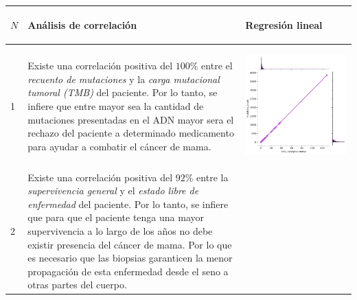 \begin{table}[htb!]
	\footnotesize
	\begin{threeparttable}
		\begin{tabular}{p{0.5cm} p{7cm} p{6.5cm}} \toprule
			\begin{center}$N$\end{center}   	 
			&\begin{center}Análisis de correlación\end{center}             
			&\begin{center}Regresión lineal\end{center}\\ \hline
			1
			& Existe una correlación positiva del $100\%$ entre el \textit{recuento de mutaciones} y la \textit{carga mutacional tumoral (TMB)} del paciente. Por lo tanto, se infiere que entre mayor sea la cantidad de mutaciones presentadas en el ADN mayor sera el rechazo del paciente a determinado medicamento para ayudar a combatir el cáncer de mama.
			
			& \begin{center}\includegraphics[width=1\linewidth]{NOTEBOOK/IMAGENES_CORRELACION/reg_tmb_nonsynonymous_mutation_count}\end{center}
			\\ \hline
			2
			& Existe una correlación positiva del $92\%$ entre la \textit{supervivencia general} y el \textit{estado libre de enfermedad} del paciente. Por lo tanto, se infiere que para que el paciente tenga una mayor supervivencia a lo largo de los años no debe existir presencia del cáncer de mama. Por lo que es necesario que las biopsias garanticen la menor propagación de esta enfermedad desde el seno a otras partes del cuerpo.
			

\end{tabular}
\end{threeparttable}
\end{table}
